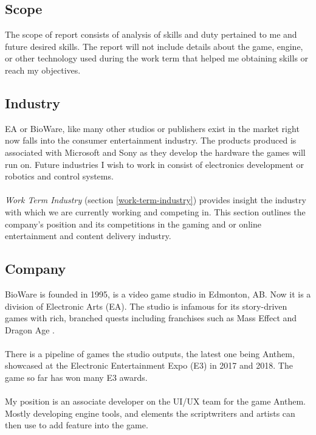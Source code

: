 \documentclass[10pt,letterpaper]{article}
\begin{document}
\subsection{Scope}\label{introduction-scope}

The scope of report consists of analysis of skills and duty pertained to me and future desired skills. The report will not include details about the game, engine, or other technology used during the work term that helped me obtaining skills or reach my objectives.

\subsection{Industry}\label{introduction-industry}

EA or BioWare, like many other studios or publishers exist in the market right now  falls into the consumer entertainment industry. The products produced is associated with Microsoft and Sony as they develop the hardware the games will run on. Future industries I wish to work in consist of electronics development or robotics and control systems.\\
\\
\textit{Work Term Industry} (section \ref{work-term-industry}) provides insight the industry with which we are currently working and competing in. This section outlines the company's position and its competitions in the gaming and or online entertainment and content delivery industry.

\subsection{Company}\label{introduction-company}

BioWare is founded in 1995, is a video game studio in Edmonton, AB. Now it is a division of Electronic Arts (EA). The studio is infamous for its story-driven games with rich, branched quests including franchises such as Mass Effect and Dragon Age \cite{bioware} \cite{bioware-wiki} \cite{bioware-list}.\\
\\
There is a pipeline of games the studio outputs, the latest one being Anthem, showcased at the Electronic Entertainment Expo (E3) in 2017 and 2018. The game so far has won many E3 awards.\\
\\
My position is an associate developer on the UI/UX team for the game Anthem. Mostly developing engine tools, and elements the scriptwriters and artists can then use to add feature into the game. \\
\end{document}
